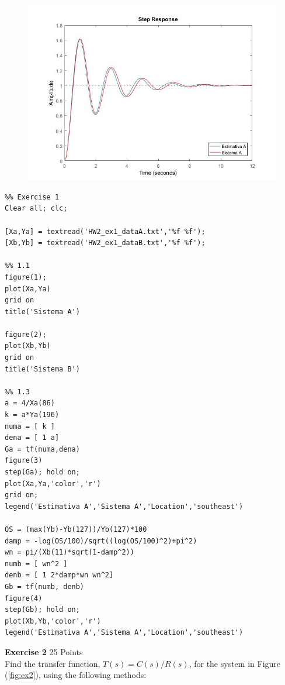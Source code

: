 \documentclass[a4paper,11pt]{article}
\begin{document}
\begin{enumerate}
	\newpage 
	\begin{figure}[!h]  \includegraphics [scale=0.5] {Figures/systemBcomparison} \end{figure}
\end{enumerate}

\begin{lstlisting}
%% Exercise 1
Clear all; clc;

[Xa,Ya] = textread('HW2_ex1_dataA.txt','%f %f');
[Xb,Yb] = textread('HW2_ex1_dataB.txt','%f %f');

%% 1.1 
figure(1);
plot(Xa,Ya)
grid on
title('Sistema A')

figure(2);
plot(Xb,Yb)
grid on
title('Sistema B')

%% 1.3
a = 4/Xa(86)
k = a*Ya(196)
numa = [ k ]
dena = [ 1 a]
Ga = tf(numa,dena)
figure(3)
step(Ga); hold on;
plot(Xa,Ya,'color','r')
grid on;
legend('Estimativa A','Sistema A','Location','southeast')

OS = (max(Yb)-Yb(127))/Yb(127)*100
damp = -log(OS/100)/sqrt((log(OS/100)^2)+pi^2)
wn = pi/(Xb(11)*sqrt(1-damp^2))
numb = [ wn^2 ]
denb = [ 1 2*damp*wn wn^2]
Gb = tf(numb, denb)
figure(4)
step(Gb); hold on;
plot(Xb,Yb,'color','r')
legend('Estimativa A','Sistema A','Location','southeast')
\end{lstlisting}
\vskip0.4cm

{\Large \noindent \bf Exercise 2} \hfill					25 Points\\

\noindent Find the transfer function, $T(s)=C(s)/R(s)$, for the system in Figure (\ref{fig:ex2}), using the following methods:
\end{document}
